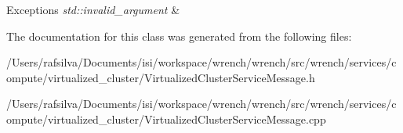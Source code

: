 \begin{DoxyExceptions}{Exceptions}
{\em std\+::invalid\+\_\+argument} & \\
\hline
\end{DoxyExceptions}


The documentation for this class was generated from the following files\+:\begin{DoxyCompactItemize}
\item 
/\+Users/rafsilva/\+Documents/isi/workspace/wrench/wrench/src/wrench/services/compute/virtualized\+\_\+cluster/Virtualized\+Cluster\+Service\+Message.\+h\item 
/\+Users/rafsilva/\+Documents/isi/workspace/wrench/wrench/src/wrench/services/compute/virtualized\+\_\+cluster/Virtualized\+Cluster\+Service\+Message.\+cpp\end{DoxyCompactItemize}
